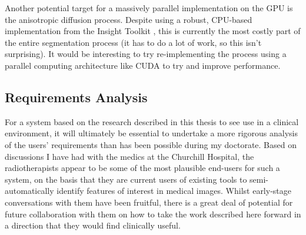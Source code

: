 Another potential target for a massively parallel implementation on the GPU is the anisotropic diffusion process. Despite using a robust, CPU-based implementation from the Insight Toolkit \cite{itk}, this is currently the most costly part of the entire segmentation process (it has to do a lot of work, so this isn't surprising). It would be interesting to try re-implementing the process using a parallel computing architecture like CUDA \cite{cuda} to try and improve performance.

\subsection{Requirements Analysis}

For a system based on the research described in this thesis to see use in a clinical environment, it will ultimately be essential to undertake a more rigorous analysis of the users' requirements than has been possible during my doctorate. Based on discussions I have had with the medics at the Churchill Hospital, the radiotherapists appear to be some of the most plausible end-users for such a system, on the basis that they are current users of existing tools to semi-automatically identify features of interest in medical images. Whilst early-stage conversations with them have been fruitful, there is a great deal of potential for future collaboration with them on how to take the work described here forward in a direction that they would find clinically useful.